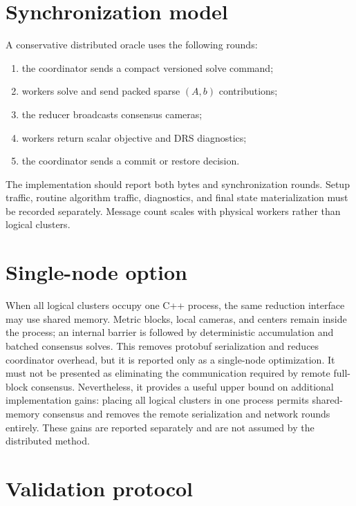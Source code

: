 \section{Synchronization model}

A conservative distributed oracle uses the following rounds:
\begin{enumerate}
  \item the coordinator sends a compact versioned solve command;
  \item workers solve and send packed sparse $(A,b)$ contributions;
  \item the reducer broadcasts consensus cameras;
  \item workers return scalar objective and DRS diagnostics;
  \item the coordinator sends a commit or restore decision.
\end{enumerate}
The implementation should report both bytes and synchronization rounds.  Setup
traffic, routine algorithm traffic, diagnostics, and final state materialization
must be recorded separately.  Message count scales with physical workers rather
than logical clusters.

\section{Single-node option}

When all logical clusters occupy one C++ process, the same reduction interface
may use shared memory.  Metric blocks, local cameras, and centers remain inside
the process; an internal barrier is followed by deterministic accumulation and
batched consensus solves.  This removes protobuf serialization and reduces
coordinator overhead, but it is reported only as a single-node optimization.
It must not be presented as eliminating the communication required by remote
full-block consensus.
Nevertheless, it provides a useful upper bound on additional implementation
gains: placing all logical clusters in one process permits shared-memory
consensus and removes the remote serialization and network rounds entirely.
These gains are reported separately and are not assumed by the distributed
method.

\section{Validation protocol}

